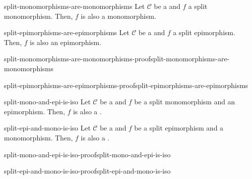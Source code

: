 \documentclass[preview]{standalone}
\begin{document}
\begin{snippetproposition}{split-monomorphisms-are-monomorphisms}{}
    Let \(\mathcal{C}\) be a \category and \(f\)
    a split monomorphism. Then, \(f\) is also a monomorphism.
\end{snippetproposition}

\begin{snippetproposition}{split-epimorphisms-are-epimorphisms}{}
    Let \(\mathcal{C}\) be a \category and \(f\)
    a split epimorphism. Then, \(f\) is also an epimorphism.
\end{snippetproposition}

\begin{snippetproof}{split-monomorphisms-are-monomorphisms-proof}{split-monomorphisms-are-monomorphisms}{}
    \todo
\end{snippetproof}

\begin{snippetproof}{split-epimorphisms-are-epimorphisms-proof}{split-epimorphisms-are-epimorphisms}{}
    \todo
\end{snippetproof}

\begin{snippetproposition}{split-mono-and-epi-is-iso}{}
    Let \(\mathcal{C}\) be a \category and \(f\)
    be a split monomorphism and an epimorphism. Then,
    \(f\) is also a \catisomorphism.
\end{snippetproposition}

\begin{snippetproposition}{split-epi-and-mono-is-iso}{}
    Let \(\mathcal{C}\) be a \category and \(f\)
    be a split epimorphism and a monomorphism. Then,
    \(f\) is also a \catisomorphism.
\end{snippetproposition}

\begin{snippetproof}{split-mono-and-epi-is-iso-proof}{split-mono-and-epi-is-iso}{}
    \todo
\end{snippetproof}

\begin{snippetproof}{split-epi-and-mono-is-iso-proof}{split-epi-and-mono-is-iso}{}
    \todo
\end{snippetproof}
\end{document}
